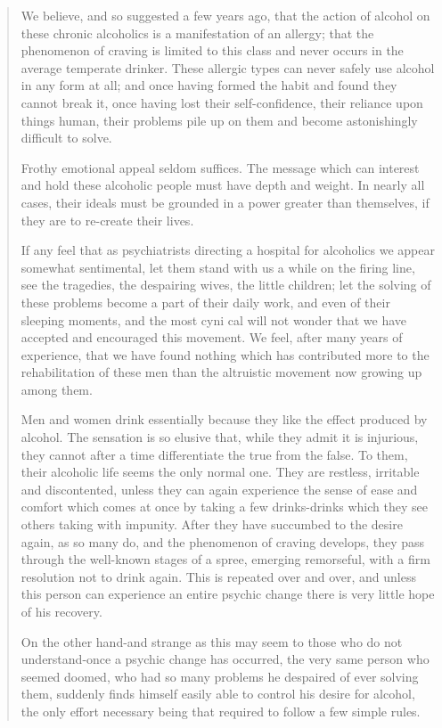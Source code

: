 \begin{quote}
We believe, and so suggested a few years ago, that the action of alcohol on these chronic alcoholics is a manifestation of an allergy; 
that the phenomenon of craving is limited to this class and never occurs in the average temperate drinker. 
These allergic types can never safely use alcohol in any form at all; 
and once having formed the habit and found they cannot break it, once having lost their self-confidence, their reliance upon things human, their problems pile up on them and become astonishingly difficult to solve.

Frothy emotional appeal seldom suffices. 
The message which can interest and hold these alcoholic people must have depth and weight. 
In nearly all cases, their ideals must be grounded in a power greater than themselves, if they are to re-create their lives.

If any feel that as psychiatrists directing a hospital for alcoholics we appear somewhat sentimental, let them stand with us a while on the firing line, see the tragedies, the despairing wives, the little children; 
let the solving of these problems become a part of their daily work, and even of their sleeping moments, and the most cyni cal will not wonder that we have accepted and encouraged this movement. 
We feel, after many years of experience, that we have found nothing which has contributed more to the rehabilitation of these men than the altruistic movement now growing up among them.

Men and women drink essentially because they like the effect produced by alcohol. 
The sensation is so elusive that, while they admit it is injurious, they cannot after a time differentiate the true from the false. 
To them, their alcoholic life seems the only normal one. 
They are restless, irritable and discontented, unless they can again experience the sense of ease and comfort which comes at once by taking a few drinks-drinks which they see others taking with impunity. 
After they have succumbed to the desire again, as so many do, and the phenomenon of craving develops, they pass through the well-known stages of a spree, emerging remorseful, with a firm resolution not to drink again. 
This is repeated over and over, and unless this person can experience an entire psychic change there is very little hope of his recovery.

On the other hand-and strange as this may seem to those who do not understand-once a psychic change has occurred, the very same person who seemed doomed, who had so many problems he despaired of ever solving them, suddenly finds himself easily able to control his desire for alcohol, the only effort necessary being that required to follow a few simple rules.


\end{quote}
